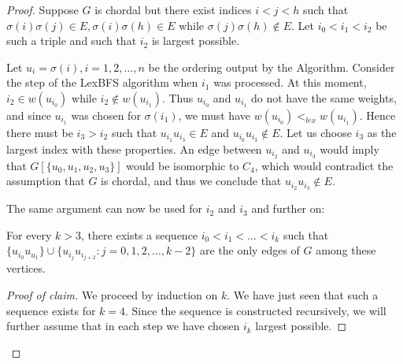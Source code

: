 \begin{proof}
	Suppose $G$ is chordal but there exist indices $i < j < h$ such that $\sigma(i)\sigma(j) \in E, \sigma(i)\sigma(h) \in E$ while $\sigma(j)\sigma(h) \notin E$. Let $i_0 < i_1 < i_2$ be such a triple and such that $i_2$ is largest possible.
	
	Let $u_i = \sigma(i), i = 1, 2, \dots , n$ be the ordering output by the Algorithm. Consider the step of the LexBFS algorithm when $i_1$ was processed. At this moment, $i_2 \in w(u_{i_0})$ while $i_2 \notin w(u_{i_1})$. Thus $u_{i_0}$ and $u_{i_1}$ do not have the same weights, and since $u_{i_1}$ was chosen for $\sigma(i_1)$, we must have $w(u_{i_0}) <_{lex} w(u_{i_1})$. Hence there must be $i_3 > i_2$ such that $u_{i_1} u_{i_3} \in E$ and $u_{i_0} u_{i_3} \notin E$. Let us choose $i_3$ as the largest index with these properties. An edge between $u_{i_2}$ and $u_{i_3}$ would imply that $G[\{u_0 , u_1 , u_2 ,u_3 \}]$ would be isomorphic to $C_4$, which would contradict the assumption that $G$ is chordal, and thus we conclude that $u_{i_2} u_{i_3} \notin E$.
	
	The same argument can now be used for $i_2$ and $i_3$ and further on:
	
	\begin{claim}
		For every $k > 3$, there exists a sequence $i_0 < i_1 < \dots < i_k$ such that $\{u_{i_0} u_{u_1}\} \cup \{u_{i_j} u_{i_{j+2}} : j = 0, 1, 2, \dots, k - 2\}$ are the only edges of $G$ among these vertices.
	\end{claim}
	
	\begin{proof}[Proof of claim]
		We proceed by induction on $k$. We have just seen that such a sequence exists for $k = 4$. Since the sequence is constructed recursively, we will further assume that in each step we have chosen $i_k$ largest possible.
		

\end{proof}
\end{proof}
